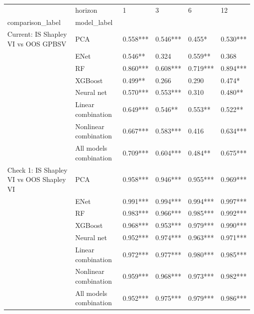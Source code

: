 \begin{tabular}{llllll}
\toprule
                                     & horizon &        1  &        3  &        6  &        12 \\
comparison\_label & model\_label &           &           &           &           \\
\midrule
Current: IS Shapley VI vs OOS GPBSV & PCA &  0.558*** &  0.546*** &    0.455* &  0.530*** \\
                                     & ENet &   0.546** &     0.324 &   0.559** &     0.368 \\
                                     & RF &  0.860*** &  0.608*** &  0.719*** &  0.894*** \\
                                     & XGBoost &   0.499** &     0.266 &     0.290 &    0.474* \\
                                     & Neural net &  0.570*** &  0.553*** &     0.310 &   0.480** \\
                                     & Linear combination &  0.649*** &   0.546** &   0.553** &   0.522** \\
                                     & Nonlinear combination &  0.667*** &  0.583*** &     0.416 &  0.634*** \\
                                     & All models combination &  0.709*** &  0.604*** &   0.484** &  0.675*** \\
Check 1: IS Shapley VI vs OOS Shapley VI & PCA &  0.958*** &  0.946*** &  0.955*** &  0.969*** \\
                                     & ENet &  0.991*** &  0.994*** &  0.994*** &  0.997*** \\
                                     & RF &  0.983*** &  0.966*** &  0.985*** &  0.992*** \\
                                     & XGBoost &  0.968*** &  0.953*** &  0.979*** &  0.990*** \\
                                     & Neural net &  0.952*** &  0.974*** &  0.963*** &  0.971*** \\
                                     & Linear combination &  0.972*** &  0.977*** &  0.980*** &  0.985*** \\
                                     & Nonlinear combination &  0.959*** &  0.968*** &  0.973*** &  0.982*** \\
                                     & All models combination &  0.952*** &  0.975*** &  0.979*** &  0.986*** \\

\end{tabular}
